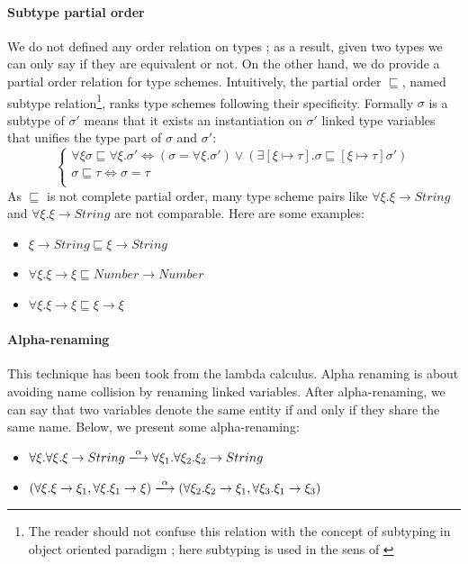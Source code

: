 \documentclass[a4paper]{report}
\begin{document}
\paragraph{Subtype partial order} We do not defined any order relation on types ; as a result, given two types we can only say if they are equivalent or not. On the other hand, we do provide a partial order relation for type schemes. Intuitively, the partial order $\sqsubseteq$, named subtype relation\footnote{The reader should not confuse this relation with the concept of subtyping in object oriented paradigm ; here subtyping is used in the sens of \cite{grad3}}, ranks type schemes following their specificity. Formally $\sigma$ is a subtype of $\sigma'$ means that it exists an instantiation on $\sigma'$ linked type variables that unifies the type part of $\sigma$ and $\sigma'$:
$$\left\{\begin{array}{l}
\forall \xi
\sigma\sqsubseteq\forall\xi.\sigma'\Leftrightarrow(\sigma = \forall\xi.\sigma')\vee(\exists[\xi\mapsto\tau].\sigma\sqsubseteq[\xi\mapsto\tau]\sigma')\\
\sigma\sqsubseteq\tau\Leftrightarrow\sigma=\tau\\
\end{array}\right.$$
As $\sqsubseteq$ is not complete partial order, many type scheme pairs like $\forall \xi.\xi\to String$ and $\forall\xi.\xi\to String$ are not comparable. Here are some examples:
\begin{itemize}
\item$\xi\to String \sqsubseteq \xi\to String$
\item$\forall\xi.\xi\to\xi\sqsubseteq Number\to Number$
\item$\forall\xi.\xi\to\xi\sqsubseteq \xi\to\xi$
\end{itemize}

\paragraph{Alpha-renaming} This technique has been took from the lambda calculus. Alpha renaming is about avoiding name collision by renaming linked variables. After alpha-renaming, we can say that two variables denote the same entity if and only if they share the same name. Below, we present some alpha-renaming:
\begin{itemize}
\item $\forall\xi.\forall\xi.\xi\to String\xlongrightarrow{\alpha} \forall\xi_1.\forall\xi_2.\xi_2\to String$
\item $(\forall\xi.\xi\to\xi_1,\forall\xi.\xi_1\to\xi)\xlongrightarrow{\alpha}(\forall\xi_2.\xi_2\to\xi_1,\forall\xi_3.\xi_1\to\xi_3)$
\end{itemize}
\end{document}

